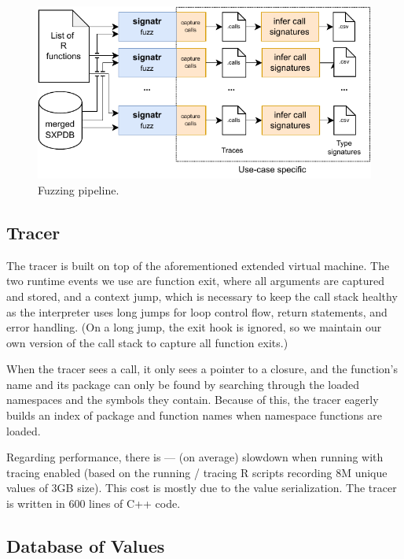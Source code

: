 \documentclass[sigplan,nonacm,anonymous,review]{acmart}
\begin{document}
\begin{figure}
    \centering
    \includegraphics[width=\columnwidth]{code-and-figures/fuzz-pipeline.pdf}
    \caption{    Fuzzing pipeline.    }\label{fig:fuzz-pipeline}
\end{figure}

\subsection{Tracer}\label{sec:argtracer}

The tracer is built on top of the aforementioned extended virtual machine.
The two runtime events we use are function exit, where all arguments are
captured and stored, and a context jump, which is necessary to keep
the call stack healthy as the interpreter uses long jumps for loop
control flow, return statements, and error handling.  (On a long jump,
the exit hook is ignored, so we maintain our own version of the call stack
to capture all function exits.)

When the tracer sees a call, it only sees a pointer to a closure, and the
function's name and its package can only be found by searching through
the loaded namespaces and the symbols they contain.  Because of this,
the tracer eagerly builds an index of package and function names when
namespace functions are loaded.

Regarding performance, there is \TRMinTracingOverhead ---
\TRMaxTracingOverhead (\TRAvgTracingOverhead on average) slowdown when
running with tracing enabled (based on the running / tracing
\TRTracingFiles R scripts recording 8M unique values of 3GB size).
This cost is mostly due to the value serialization.  The tracer is written in 600 lines of
C++ code.

\subsection{Database of Values}\label{sec:sxpdb}
\end{document}
